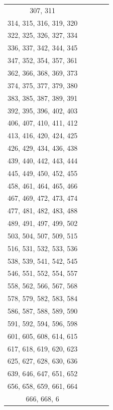 \documentclass{article}
\begin{document}
\begin{table}[h]
\begin{tabular}{c|c|c|c|c}
 307, 311\\314, 315, 316, 319, 320\\322, 325, 326, 327, 334\\336, 337, 342, 344, 345\\347, 352, 354, 357, 361\\362, 366, 368, 369, 373\\374, 375, 377, 379, 380\\383, 385, 387, 389, 391\\392, 395, 396, 402, 403\\406, 407, 410, 411, 412\\413, 416, 420, 424, 425\\426, 429, 434, 436, 438\\439, 440, 442, 443, 444\\445, 449, 450, 452, 455\\458, 461, 464, 465, 466\\467, 469, 472, 473, 474\\477, 481, 482, 483, 488\\489, 491, 497, 499, 502\\503, 504, 507, 509, 515\\516, 531, 532, 533, 536\\538, 539, 541, 542, 545\\546, 551, 552, 554, 557\\558, 562, 566, 567, 568\\578, 579, 582, 583, 584\\586, 587, 588, 589, 590\\591, 592, 594, 596, 598\\601, 605, 608, 614, 615\\617, 618, 619, 620, 623\\625, 627, 628, 630, 636\\639, 646, 647, 651, 652\\656, 658, 659, 661, 664\\666, 668, 6
\end{tabular}
\end{table}
\end{document}
